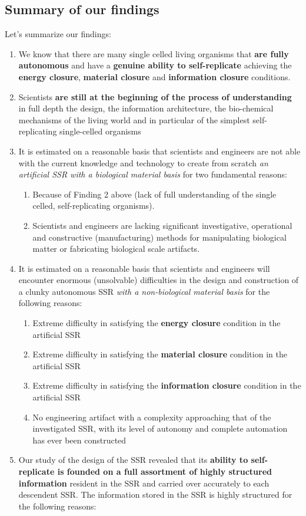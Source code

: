 \subsection{Summary of our findings}

Let’s summarize our findings:

\begin{enumerate}
\item We know that there are many single celled living organisms that
\textbf{are fully autonomous} and have a \textbf{genuine ability to
self-replicate} achieving the \textbf{energy closure}, \textbf{material
closure} and \textbf{information closure} conditions.
\item Scientists \textbf{are still at the beginning of the process of
understanding} in full depth the design, the information architecture,
the bio-chemical mechanisms of the living world and in particular of
the simplest self-replicating single-celled organisms
\item It is estimated on a reasonable basis that scientists and
engineers are not able with the current knowledge and technology to
create from scratch \textit{an artificial SSR with a biological
material basis} for two fundamental reasons:

\begin{enumerate}
\item Because of Finding 2 above (lack of full understanding of the
single celled, self-replicating organisms).
\item Scientists and engineers are lacking significant investigative,
operational and constructive (manufacturing) methods for manipulating
biological matter or fabricating biological scale artifacts.
\end{enumerate}
\item It is estimated on a reasonable basis that scientists and
engineers will encounter enormous (unsolvable) difficulties in the
design and construction of a clunky autonomous SSR \textit{with a
non-biological material basis} for the following reasons:

\begin{enumerate}
\item Extreme difficulty in satisfying the \textbf{energy closure}
condition in the artificial SSR 
\item Extreme difficulty in satisfying the \textbf{material closure}
condition in the artificial SSR 
\item Extreme difficulty in satisfying the \textbf{information closure}
condition in the artificial SSR
\item No engineering artifact with a complexity approaching that of the
investigated SSR, with its level of autonomy and complete automation
has ever been constructed
\end{enumerate}
\item Our study of the design of the SSR revealed that its
\textbf{ability to self-replicate is founded on a full assortment of
highly structured information} resident in the SSR and carried over
accurately to each descendent SSR.  The information stored in the SSR
is highly structured for the following reasons:


\end{enumerate}
